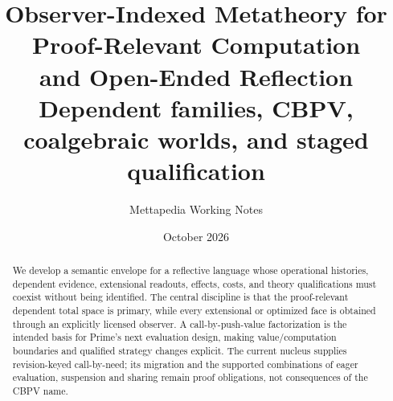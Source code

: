 \documentclass[11pt]{article}
\title{Observer-Indexed Metatheory for Proof-Relevant Computation\\
  and Open-Ended Reflection\\[3pt]
  \large Dependent families, CBPV, coalgebraic worlds, and staged qualification}
\author{Mettapedia Working Notes}
\date{October 2026}
\theoremstyle{definition}
\theoremstyle{remark}
\begin{document}
\maketitle

\begin{abstract}
We develop a semantic envelope for a reflective language whose operational
histories, dependent evidence, extensional readouts, effects, costs, and theory
qualifications must coexist without being identified.  The central discipline is
that the proof-relevant dependent total space is primary, while every extensional
or optimized face is obtained through an explicitly licensed observer.  A
call-by-push-value factorization is the intended basis for Prime's next
evaluation design, making value/computation boundaries and qualified strategy
changes explicit. The current nucleus supplies revision-keyed call-by-need;
its migration and the supported combinations of eager evaluation, suspension
and sharing remain proof obligations, not consequences of the CBPV name.


\end{abstract}
\end{document}
